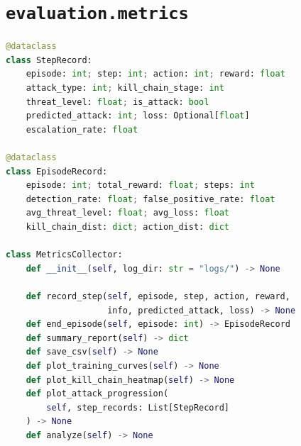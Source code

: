 \section{\texttt{evaluation.metrics}}

\begin{lstlisting}[language=Python, caption={MetricsCollector interface.}]
@dataclass
class StepRecord:
    episode: int; step: int; action: int; reward: float
    attack_type: int; kill_chain_stage: int
    threat_level: float; is_attack: bool
    predicted_attack: int; loss: Optional[float]
    escalation_rate: float

@dataclass
class EpisodeRecord:
    episode: int; total_reward: float; steps: int
    detection_rate: float; false_positive_rate: float
    avg_threat_level: float; avg_loss: float
    kill_chain_dist: dict; action_dist: dict

class MetricsCollector:
    def __init__(self, log_dir: str = "logs/") -> None

    def record_step(self, episode, step, action, reward,
                    info, predicted_attack, loss) -> None
    def end_episode(self, episode: int) -> EpisodeRecord
    def summary_report(self) -> dict
    def save_csv(self) -> None
    def plot_training_curves(self) -> None
    def plot_kill_chain_heatmap(self) -> None
    def plot_attack_progression(
        self, step_records: List[StepRecord]
    ) -> None
    def analyze(self) -> None
\end{lstlisting}
